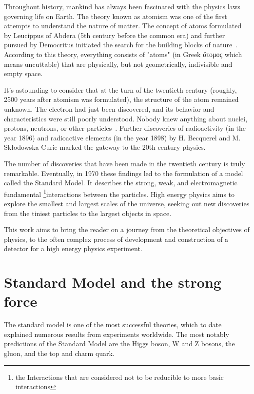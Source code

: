 Throughout history, mankind has always been fascinated with the physics laws governing life on Earth. The theory known as atomism was one of the first attempts to understand the nature of matter. The concept of atoms formulated by Leucippus of Abdera (5th century before the common era) and further pursued by Democritus initiated the search for the building blocks of nature~\cite{sep-atomism-ancient}. According to this theory, everything consists of "atoms" (in Greek \foreignlanguage{greek}{ἄτομος} which means uncuttable) that are physically, but not geometrically, indivisible and empty space. 

It's astounding to consider that at the turn of the twentieth century (roughly, 2500 years after atomism was formulated), the structure of the atom remained unknown. The electron had just been discovered, and its behavior and characteristics were still poorly understood. Nobody knew anything about nuclei, protons, neutrons, or other particles~\cite{intro_particle_physics}. 
Further discoveries of radioactivity (in the year 1896) and radioactive elements (in the year 1898) by H. Becquerel and M. Skłodowska-Curie marked the gateway to the 20th-century physics. 

The number of discoveries that have been made in the twentieth century is truly remarkable. Eventually, in 1970 these findings led to the formulation of a model called the Standard Model. It describes the strong, weak, and electromagnetic fundamental \footnote{the Interactions that are considered not to be reducible to more basic interactions}{interactions} between the particles. 
 High energy physics aims to explore the smallest and largest scales of the universe, seeking out new discoveries from the tiniest particles to the largest objects in space.
 
 This work aims to bring the reader on a journey from the theoretical objectives of physics, to the often complex process of development and construction of a detector for a high energy physics experiment.
 
\section{Standard Model and the strong force}

The standard model is one of the most successful theories, which to date explained numerous results from experiments worldwide. The most notably predictions of the Standard Model are the Higgs boson, W and Z bosons, the gluon, and the top and charm quark.

